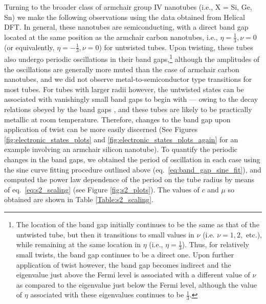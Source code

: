 \documentclass[preprint,12pt, 3p, sort&compress]{elsarticle}
\begin{document}
Turning to the broader class of armchair group IV nanotubes (i.e., X = Si, Ge, Sn) we make the following observations using the data obtained from Helical DFT. In general, these nanotubes are semiconducting, with a direct band gap located at the same position as the armchair carbon nanotubes, i.e., $\eta = \frac{1}{3}, \nu = 0$ (or equivalently, $\eta = -\frac{1}{3}, \nu = 0$) for untwisted tubes. Upon twisting, these tubes also undergo periodic oscillations in their band gaps,\footnote{The location of the band gap initially continues to be the same as that of the untwisted tube, but then it transitions to small values in $\nu$ (i.e. $\nu = 1, 2,$ etc.), while remaining at the same location in $\eta$ (i.e., $\eta = \frac{1}{3}$). Thus, for relatively small twists, the band gap continues to be a direct one. Upon further application of twist however, the band gap becomes indirect and the eigenvalue just above the Fermi level is associated with a different value of $\nu$ as compared to the eigenvalue just below the Fermi level, although the value of $\eta$ associated with these eigenvalues continues to be $\frac{1}{3}$.} although the amplitudes of the oscillations are generally more muted than the case of armchair carbon nanotubes, and we did not observe metal-to-semiconductor type transitions for most tubes. For  tubes with larger radii however, the untwisted states can be associated with vanishingly small band gaps to begin with --- owing to the decay relations obeyed by the band gaps \citep{ghosh2019symmetry, wang2017band}, and these tubes are likely to be practically metallic at room temperature. Therefore, changes to the band gap upon application of twist can be more easily discerned (See Figures  \ref{fig:electronic_states_plots} and \ref{fig:electronic_states_plots_again} for an example involving an armchair silicon nanotube). To quantify the periodic changes in the band gaps, we obtained the period of oscillation in each case using the sine curve fitting procedure outlined above (eq.~\ref{eq:band_gap_sine_fit}), and computed the power law dependence of the period on the tube radius by means of eq.~\ref{eq:s2_scaling} (see Figure \ref{fig:s2_plots}). The values of $c$ and $\mu$ so obtained are shown in Table \ref{Table:s2_scaling}. 
\end{document}
